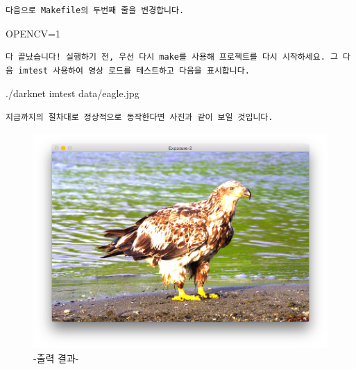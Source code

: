 \documentclass{article}
\begin{document}
\begin{verbatim}
다음으로 Makefile의 두번째 줄을 변경합니다.
\end{verbatim}
 OPENCV=1 
 
\begin{verbatim}
다 끝났습니다! 실행하기 전, 우선 다시 make를 사용해 프로젝트를 다시 시작하세요. 그 다음 imtest 사용하여 영상 로드를 테스트하고 다음을 표시합니다.
\end{verbatim}
 ./darknet imtest data/eagle.jpg 
 
 \begin{verbatim}
지금까지의 절차대로 정상적으로 동작한다면 사진과 같이 보일 것입니다.
\end{verbatim}
\begin{figure}[h!]
\centering
\includegraphics[scale=0.2]{egle.png}
\caption{-출력 결과-}
\label{fig:detect}
\end{figure}
 
  




\end{document}
